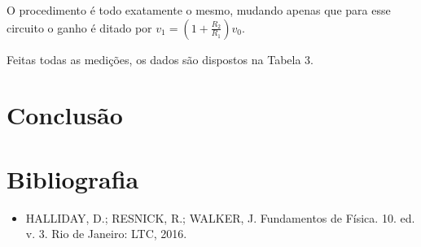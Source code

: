 \documentclass[a4 paper]{article}
\begin{document}
O procedimento é todo exatamente o mesmo, mudando apenas que para esse circuito o ganho é ditado por $v_1=(1+\frac{R_2}{R_1})v_0$.

Feitas todas as medições, os dados são dispostos na Tabela 3.







\section{Conclusão}

\section{Bibliografia}
\begin{itemize}
\item HALLIDAY, D.; RESNICK, R.; WALKER, J. Fundamentos de Física. 10. ed. v. 3. Rio de Janeiro: LTC, 2016.
\end{itemize}
\end{document}
